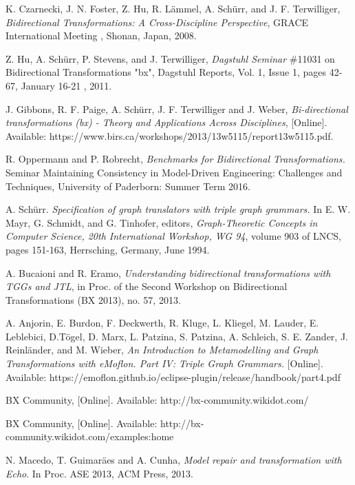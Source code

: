 \begin{thebibliography}{1}
	
	 K. Czarnecki, J. N. Foster, Z. Hu, R. L\"ammel, A. Sch\"urr, and J. F. Terwilliger,  {\em Bidirectional Transformations: A Cross-Discipline Perspective}, GRACE International Meeting , Shonan, Japan, 2008.
	
	 Z. Hu, A. Sch\"urr, P. Stevens, and J. Terwilliger,  {\em Dagstuhl Seminar} \#11031 on Bidirectional Transformations "bx", Dagstuhl Reports, Vol. 1, Issue 1, pages 42-67, January 16-21 , 2011.
	
	 J. Gibbons, R. F. Paige, A. Sch\"urr, J. F. Terwilliger and J. Weber, {\em Bi-directional transformations (bx) - Theory and Applications Across Disciplines}, [Online]. Available:  https://www.birs.ca/workshops/2013/13w5115/report13w5115.pdf.
	
	 R. Oppermann and P. Robrecht, {\em Benchmarks for Bidirectional Transformations.} Seminar Maintaining Consistency in Model-Driven Engineering: Challenges and Techniques, University of Paderborn: Summer Term 2016.
	
	 A. Sch\"urr. {\em Specification of graph translators with triple graph grammars.} In E. W. Mayr, G. Schmidt, and G. Tinhofer, editors, {\em Graph-Theoretic
		Concepts in Computer Science, 20th International Workshop, WG 94}, volume 903 of LNCS, pages 151-163, Herrsching, Germany, June 1994.
	
	 A. Bucaioni and R. Eramo, {\em Understanding bidirectional transformations with TGGs and JTL}, in Proc. of the Second Workshop on Bidirectional Transformations (BX 2013), no. 57, 2013.
	
	 A. Anjorin, E. Burdon, F. Deckwerth, R. Kluge, L. Kliegel, M. Lauder, E. Leblebici, D.T\"ogel, D. Marx, L. Patzina, S. Patzina, A. Schleich, S. E. Zander, J. Reinl\"ander, and M. Wieber, {\em An Introduction to	Metamodelling and Graph Transformations with eMoflon. Part IV: Triple Graph Grammars.} [Online]. Available: 
	https://emoflon.github.io/eclipse-plugin/release/handbook/part4.pdf
	
	 BX Community, [Online]. Available: http://bx-community.wikidot.com/
	
	 BX Community, [Online]. Available: http://bx-community.wikidot.com/examples:home
	
	 N. Macedo, T. Guimar\"aes and A. Cunha, {\em Model repair and transformation with Echo}. In Proc. ASE 2013, ACM Press, 2013.
	

\end{thebibliography}

